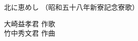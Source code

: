 \documentclass[10pt,b5j]{tarticle} %
\begin{document}
\begin{minipage}[c]{0.7\hsize} %
    \begin{center}
        {\LARGE
            北に恵めし %
        }
        {\small 
            （昭和五十八年新寮記念寮歌） %
        }
    \end{center}
\end{minipage}
\begin{minipage}[c]{0.3\hsize} %
    \begin{flushright} %
        大崎益孝君 作歌\\竹中秀文君 作曲 %
    \end{flushright}
\end{minipage}
\end{document}
